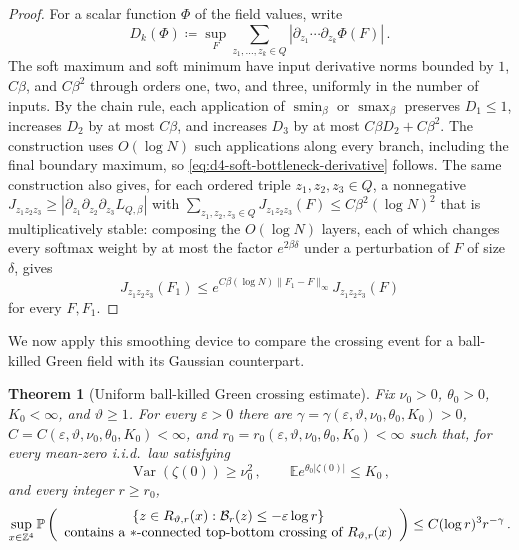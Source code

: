 \documentclass[11pt]{amsart}
\theoremstyle{plain}
\newtheorem{theorem}{Theorem}[section]
\theoremstyle{definition}
\newcommand{\Z}{\mathbb{Z}}
\newcommand{\E}{\mathbb{E}}
\renewcommand{\P}{\mathbb{P}}
\DeclareMathOperator{\Var}{Var}
\begin{document}
\begin{proof}
	For a scalar function $\Phi$ of the field values, write
	\[
		D_k(\Phi)\coloneqq
		\sup_F
		\sum_{z_1,\ldots,z_k\in Q}
		|\partial_{z_1}\cdots\partial_{z_k}\Phi(F)|\, .
	\]
	The soft maximum and soft minimum have input derivative norms bounded by $1$, $C\beta$, and $C\beta^2$ through orders one, two, and three, uniformly in the number of inputs. By the chain rule, each application of $\operatorname{smin}_\beta$ or $\operatorname{smax}_\beta$ preserves $D_1\leq1$, increases $D_2$ by at most
	$C\beta$, and increases $D_3$ by at most $C\beta D_2+C\beta^2$. The construction uses $O(\log N)$ such applications along every branch, including the final boundary maximum, so \eqref{eq:d4-soft-bottleneck-derivative} follows.
	The same construction also gives, for each ordered triple $z_1,z_2,z_3\in Q$, a nonnegative $J_{z_1z_2z_3}\geq|\partial_{z_1}\partial_{z_2}\partial_{z_3}L_{Q,\beta}|$ with $\sum_{z_1,z_2,z_3\in Q}J_{z_1z_2z_3}(F)\leq C\beta^2(\log N)^2$ that is multiplicatively stable: composing the $O(\log N)$ layers, each of which changes every softmax weight by at most the factor $e^{2\beta\delta}$ under a perturbation of $F$ of size $\delta$, gives
	\begin{equation}\label{eq:d4-soft-bottleneck-stability}
		J_{z_1z_2z_3}(F_1)\leq e^{C\beta(\log N)\|F_1-F\|_\infty}J_{z_1z_2z_3}(F)
	\end{equation}
	for every $F,F_1$.
\end{proof}

We now apply this smoothing device to compare the crossing event for a ball-killed Green field with its Gaussian counterpart.

\begin{theorem}[Uniform ball-killed Green crossing estimate]
\label{thm:d4-ball-green-crossing}
Fix $\nu_{0}>0$, $\theta_{0}>0$, $K_{0}<\infty$, and $\vartheta\geq1$. For every
$\varepsilon>0$ there are $\gamma=\gamma(\varepsilon,\vartheta,\nu_{0},\theta_{0},K_{0})>0$, $C=C(\varepsilon,\vartheta,\nu_{0},\theta_{0},K_{0})<\infty$, and $r_0=r_0(\varepsilon,\vartheta,\nu_{0},\theta_{0},K_{0})<\infty$ such that, for every
mean-zero i.i.d.\ law satisfying
\[
    \Var(\zeta(0))\geq\nu_{0}^2\, ,
    \qquad
    \E e^{\theta_{0}|\zeta(0)|}\leq K_{0}\, ,
\]
and every integer $r\geq r_0$,
\[
\sup_{x\in\Z^4}
\P\left(
\begin{array}{c}
\{z\in R_{\vartheta,r}(x):\mathcal B_r(z)\leq-\varepsilon\log r\}\\
\textup{contains a $\ast$-connected top-bottom crossing of }R_{\vartheta,r}(x)
\end{array}
\right)
\leq C(\log r)^3r^{-\gamma}\, .
\]
\end{theorem}
\end{document}
